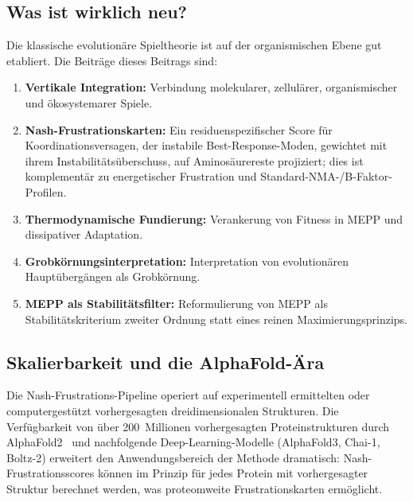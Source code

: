 \documentclass[12pt,a4paper]{article}
\theoremstyle{remark}
\begin{document}
\subsection{Was ist wirklich neu?}

Die klassische evolutionäre Spieltheorie ist auf der organismischen Ebene gut etabliert. Die Beiträge dieses Beitrags sind:
\begin{enumerate}
    \item \textbf{Vertikale Integration:} Verbindung molekularer, zellulärer, organismischer und ökosystemarer Spiele.
    \item \textbf{Nash-Frustrationskarten:} Ein residuenspezifischer Score für Koordinationsversagen, der instabile Best-Response-Moden, gewichtet mit ihrem Instabilitätsüberschuss, auf Aminosäurereste projiziert; dies ist komplementär zu energetischer Frustration und Standard-NMA-/B-Faktor-Profilen.
    \item \textbf{Thermodynamische Fundierung:} Verankerung von Fitness in MEPP und dissipativer Adaptation.
    \item \textbf{Grobkörnungsinterpretation:} Interpretation von evolutionären Hauptübergängen als Grobkörnung.
    \item \textbf{MEPP als Stabilitätsfilter:} Reformulierung von MEPP als Stabilitätskriterium zweiter Ordnung statt eines reinen Maximierungsprinzips.
\end{enumerate}

\subsection{Skalierbarkeit und die AlphaFold-Ära}
\label{sec:alphafold-scalability}

Die Nash-Frustrations-Pipeline operiert auf experimentell ermittelten oder computergestützt vorhergesagten dreidimensionalen Strukturen. Die Verfügbarkeit von über 200~Millionen vorhergesagten Proteinstrukturen durch AlphaFold2~\citep{JumperAF2021} und nachfolgende Deep-Learning-Modelle (AlphaFold3, Chai-1, Boltz-2) erweitert den Anwendungsbereich der Methode dramatisch: Nash-Frustrationsscores können im Prinzip für jedes Protein mit vorhergesagter Struktur berechnet werden, was proteomweite Frustrationskarten ermöglicht.
\end{document}

